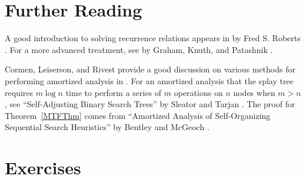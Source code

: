\section{Further Reading}
A good introduction to solving recurrence relations appears in
 by Fred S. Roberts \cite{Combinatorics}.
For a more advanced treatment, see  by
Graham, Knuth, and Patashnik \cite{ConcreteMath}.

Cormen, Leiserson, and Rivest provide a good discussion on
various methods for performing amortized analysis in
 \cite{CLR}.
For an amortized analysis that the splay tree requires $m \log n$ time
to perform a series of $m$ operations on $n$ nodes when $m>n$,
see ``Self-Adjusting Binary Search Trees'' by Sleator and
Tarjan \cite{SplayRef}.
The proof for Theorem~\ref{MTFThm} comes from
``Amortized Analysis of Self-Organizing Sequential Search
Heuristics'' by Bentley and McGeoch \cite{BentOrganize}.

\section{Exercises}

